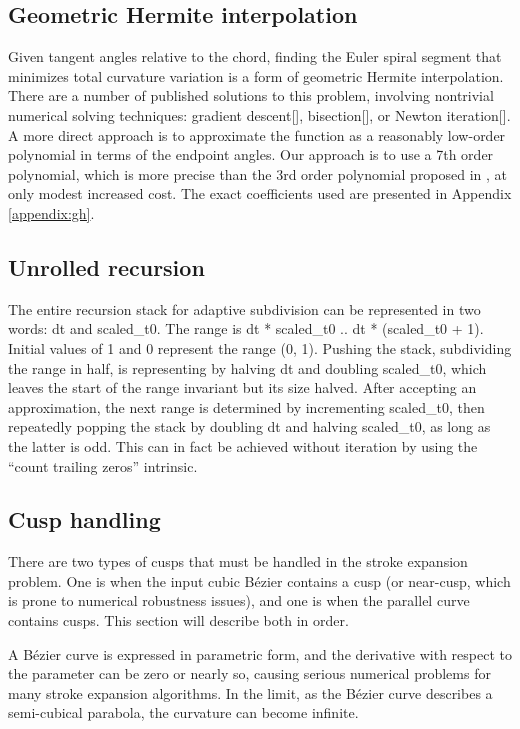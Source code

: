 \documentclass[sigconf, authordraft]{acmart}
\begin{document}
\subsection{Geometric Hermite interpolation}

Given tangent angles relative to the chord, finding the Euler spiral segment that minimizes total curvature variation is a form of geometric Hermite interpolation. There are a number of published solutions to this problem, involving nontrivial numerical solving techniques: gradient descent[], bisection[], or Newton iteration[]. A more direct approach is to approximate the function as a reasonably low-order polynomial in terms of the endpoint angles. Our approach is to use a 7th order polynomial, which is more precise than the 3rd order polynomial proposed in \citet{Reif2021}, at only modest increased cost. The exact coefficients used are presented in Appendix \ref{appendix:gh}.

\subsection{Unrolled recursion}

The entire recursion stack for adaptive subdivision can be represented in two words: dt and scaled\_t0. The range is dt * scaled\_t0 .. dt * (scaled\_t0 + 1). Initial values of 1 and 0 represent the range (0, 1). Pushing the stack, subdividing the range in half, is representing by halving dt and doubling scaled\_t0, which leaves the start of the range invariant but its size halved. After accepting an approximation, the next range is determined by incrementing scaled\_t0, then repeatedly popping the stack by doubling dt and halving scaled\_t0, as long as the latter is odd. This can in fact be achieved without iteration by using the ``count trailing zeros'' intrinsic.

\subsection{Cusp handling}

There are two types of cusps that must be handled in the stroke expansion problem. One is when the input cubic Bézier contains a cusp (or near-cusp, which is prone to numerical robustness issues), and one is when the parallel curve contains cusps. This section will describe both in order.

A Bézier curve is expressed in parametric form, and the derivative with respect to the parameter can be zero or nearly so, causing serious numerical problems for many stroke expansion algorithms. In the limit, as the Bézier curve describes a semi-cubical parabola, the curvature can become infinite.
\end{document}
